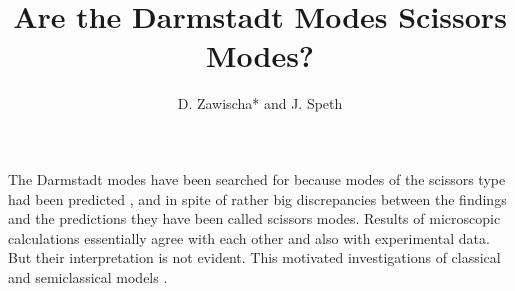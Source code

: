 \documentclass[fleqn,twocolumn,a4paper]{ikpar}
\begin{document}
\parindent=0pt
\frenchspacing

\title{{\bf
Are the Darmstadt Modes Scissors Modes?}}
\author{D. Zawischa*
and J. Speth
}
\maketitle
The Darmstadt modes
\cite{r1}
have been searched for
because modes of the scissors
type had been predicted \cite{r3,r4},
and in spite of rather big
discrepancies between the findings and the predictions they
have been called scissors modes.
Results of microscopic calculations
essentially agree with each other and also with experimental
data. But their interpretation is not evident. This motivated
investigations of classical and semiclassical models \cite{r14,r17,r17a}.
\par
\medskip
\end{document}
